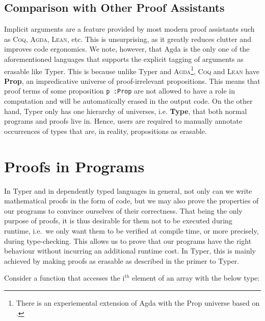 \documentclass[12pt,twoside,maitrise]{dms}
\theoremstyle{definition}
\numberwithin{equation}{section}
\numberwithin{table}{chapter}
\numberwithin{figure}{chapter}
\newcommand\fn[1] {\texttt{#1}}
\def\Coq{\textsc{Coq}\xspace}
\def\Agda{\textsc{Agda}\xspace}
\def\Lean{\textsc{Lean}\xspace}
\begin{document}
\subsection{Comparison with Other Proof Assistants}

Implicit arguments are a feature provided by most modern proof assistants such
as \Coq{}, \Agda{}, \Lean{}, etc. This is unsurprising, as it greatly reduces
clutter and improves code ergonomics. We note, however, that Agda is the only
one of the aforementioned languages that supports the explicit tagging of
arguments as erasable like Typer. This is because unlike Typer and
\Agda{}\footnote{There is an experiemental extension of Agda with the Prop
universe based on \cite{gilbert2019definitional}.}, \Coq{} and \Lean{} have
\textbf{Prop}, an impredicative universe of proof-irrelevant propositions. This
means that proof terms of some proposition \fn{p :\@ Prop} are not allowed to
have a role in computation and will be automatically erased in the output code.
On the other hand, Typer only has one hierarchy of universes, i.e.
\textbf{Type}, that both normal programs and proofs live in. Hence, users are
required to manually annotate occurrences of types that are, in reality,
propositions as erasable.


\section{Proofs in Programs}


In Typer and in dependently typed languages in general, not only can we write
mathematical proofs in the form of code, but we may also prove the properties
of our programs to convince ourselves of their correctness. That being the only
purpose of proofs, it is thus desirable for them not to be executed during
runtime, i.e.\ we only want them to be verified at compile time, or more
precisely, during type-checking. This allows us to prove that our programs have
the right behaviour without incurring an additional runtime cost. In Typer,
this is mainly achieved by making proofs as erasable as described in the primer
to Typer.

Consider a function that accesses the i$^{th}$ element of an array with the
below type:
\end{document}
